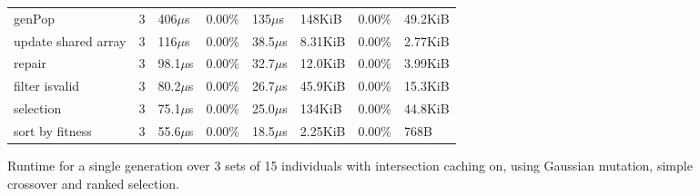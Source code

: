 \begin{appendices}
\begin{figure}
\begin{tabular}{l l l l l l l l}
     \hspace{12pt}genPop                      &   3  &  406\(\mu\)s & 0.00\% &  135\(\mu\)s   & 148KiB  &0.00\%  &49.2KiB\\
     \hspace{12pt}update shared array         &   3  &  116\(\mu\)s & 0.00\% & 38.5\(\mu\)s   &8.31KiB  &0.00\%  &2.77KiB\\
     \hspace{12pt}repair                      &   3  & 98.1\(\mu\)s & 0.00\% & 32.7\(\mu\)s   &12.0KiB  &0.00\%  &3.99KiB\\
     \hspace{12pt}filter isvalid              &   3  & 80.2\(\mu\)s & 0.00\% & 26.7\(\mu\)s   &45.9KiB  &0.00\%  &15.3KiB\\
     \hspace{12pt}selection                   &   3  & 75.1\(\mu\)s & 0.00\% & 25.0\(\mu\)s   & 134KiB  &0.00\%  &44.8KiB\\
     \hspace{12pt}sort by fitness             &   3  & 55.6\(\mu\)s & 0.00\% & 18.5\(\mu\)s   &2.25KiB  &0.00\%  &   768B\\
      \hline
  \end{tabular}
  \caption{\label{app:tab:MARuntime} Runtime for a single generation over 3 sets of 15 individuals with intersection caching on, using Gaussian mutation, simple crossover and ranked selection.}
  \end{figure}

\end{appendices}

